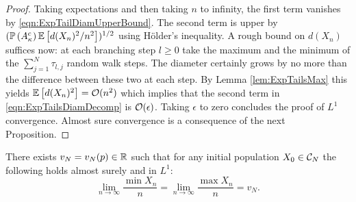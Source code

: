 \begin{proof}
Taking expectations and then taking $n$ to infinity, the first term vanishes by \ref{eqn:ExpTailDiamUpperBound}. The second term is upper by $(\Pr{A_\kappa^c} \Ex{d(X_n)^2 / n^2})^{1/2}$ using Hölder's inequality. A rough bound on $d(X_n)$ suffices now: at each branching step $l \geq 0$ take the maximum and the minimum of the $\sum_{j=1}^N \tau_{l, j}$ random walk steps. The diameter certainly grows by no more than the difference between these two at each step. By Lemma \ref{lem:ExpTailsMax} this yields $\Ex{d(X_n)^2} = \cal{O}(n^2)$ which implies that the second term in \ref{eqn:ExpTailsDiamDecomp} is $\cal{O}(\epsilon)$. Taking $\epsilon$ to zero concludes the proof of $L^1$ convergence. Almost sure convergence is a consequence of the next Proposition. 
\end{proof}

\begin{proposition}\label{prop:ExpTailsSpeedExistence}
There exists $v_N = v_N(p) \in \R$ such that for any initial population $X_0 \in \cal{C}_N$ the following holds almost surely and in $L^1$:
\begin{equation}
\lim\limits_{n \to \infty} \frac{\min X_n}{n} = \lim\limits_{n \to \infty} \frac{\max X_n}{n} = v_N. 
\end{equation}
\end{proposition}

